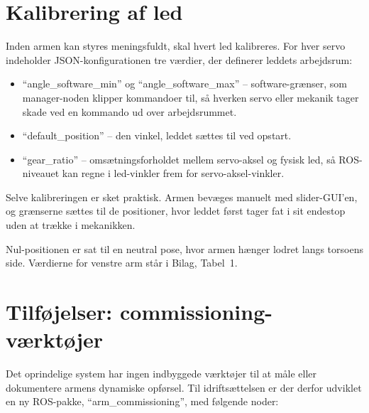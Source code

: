 \clearpage
\section{Kalibrering af led}

Inden armen kan styres meningsfuldt, skal hvert led kalibreres. For
hver servo indeholder JSON-konfigurationen tre værdier, der
definerer leddets arbejdsrum:

\begin{itemize}
    \item \enquote{angle\_software\_min} og
          \enquote{angle\_software\_max} -- software-grænser, som
          manager-noden klipper kommandoer til, så hverken servo
          eller mekanik tager skade ved en kommando ud over
          arbejdsrummet.
    \item \enquote{default\_position} -- den vinkel, leddet sættes
          til ved opstart.
    \item \enquote{gear\_ratio} -- omsætningsforholdet mellem
          servo-aksel og fysisk led, så ROS-niveauet kan regne i
          led-vinkler frem for servo-aksel-vinkler.
\end{itemize}

Selve kalibreringen er sket praktisk. Armen bevæges manuelt med
slider-GUI'en, og grænserne sættes til de positioner, hvor leddet
først tager fat i sit endestop uden at trække i mekanikken.

Nul-positionen er sat til en neutral pose, hvor armen hænger lodret
langs torsoens side. Værdierne for venstre arm står i Bilag, Tabel~1.

\clearpage
\section{Tilføjelser: commissioning-værktøjer}
\label{sec:commissioning-vaerktoejer}

Det oprindelige system har ingen indbyggede værktøjer til at måle
eller dokumentere armens dynamiske opførsel. Til idriftsættelsen er
der derfor udviklet en ny ROS-pakke, \enquote{arm\_commissioning},
med følgende noder:

